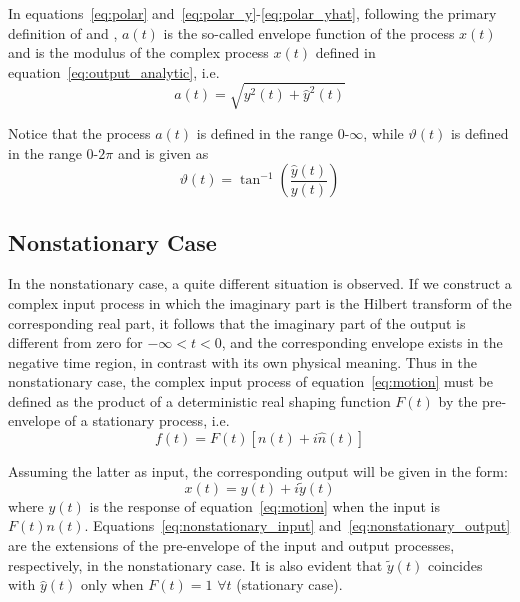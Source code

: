 \documentclass[11pt]{article}
\begin{document}
In equations~\eqref{eq:polar} and~\eqref{eq:polar_y}-\eqref{eq:polar_yhat}, following the primary definition of \cite{dugundji1958} and \cite{cramer1967}, $a(t)$ is the so-called envelope function of the process $x(t)$ and is the modulus of the complex process $x(t)$ defined in equation~\eqref{eq:output_analytic}, i.e.
\begin{equation}
a(t) = \sqrt{y^2(t) + \hat{y}^2(t)}
\label{eq:envelope}
\end{equation}

Notice that the process $a(t)$ is defined in the range $0$-$\infty$, while $\vartheta(t)$ is defined in the range $0$-$2\pi$ and is given as
\begin{equation}
\vartheta(t) = \tan^{-1}\left(\frac{\hat{y}(t)}{y(t)}\right)
\label{eq:phase}
\end{equation}

\subsection{Nonstationary Case}
\label{sec:nonstationary}

In the nonstationary case, a quite different situation is observed. If we construct a complex input process in which the imaginary part is the Hilbert transform of the corresponding real part, it follows that the imaginary part of the output is different from zero for $-\infty < t < 0$, and the corresponding envelope exists in the negative time region, in contrast with its own physical meaning. Thus in the nonstationary case, the complex input process of equation~\eqref{eq:motion} must be defined as the product of a deterministic real shaping function $F(t)$ by the pre-envelope of a stationary process, i.e.
\begin{equation}
f(t) = F(t)[n(t) + i\hat{n}(t)]
\label{eq:nonstationary_input}
\end{equation}

Assuming the latter as input, the corresponding output will be given in the form:
\begin{equation}
x(t) = y(t) + i\tilde{y}(t)
\label{eq:nonstationary_output}
\end{equation}
where $y(t)$ is the response of equation~\eqref{eq:motion} when the input is $F(t)n(t)$. Equations~\eqref{eq:nonstationary_input} and~\eqref{eq:nonstationary_output} are the extensions of the pre-envelope of the input and output processes, respectively, in the nonstationary case. It is also evident that $\tilde{y}(t)$ coincides with $\hat{y}(t)$ only when $F(t) = 1$ $\forall t$ (stationary case).
\end{document}
